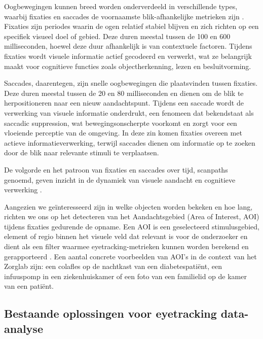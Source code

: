 Oogbewegingen kunnen breed worden onderverdeeld in verschillende types, waarbij fixaties en saccades de voornaamste blik-afhankelijke metrieken zijn \autocite{PAUSZEK2023100031}.
Fixaties zijn periodes waarin de ogen relatief stabiel blijven en zich richten op een specifiek visueel doel of gebied.
Deze duren meestal tussen de 100 en 600 milliseconden, hoewel deze duur afhankelijk is van contextuele factoren.
Tijdens fixaties wordt visuele informatie actief gecodeerd en verwerkt, wat ze belangrijk maakt voor cognitieve functies zoals objectherkenning, lezen en besluitvorming.
\newline \par
Saccades, daarentegen, zijn snelle oogbewegingen die plaatsvinden tussen fixaties.
Deze duren meestal tussen de 20 en 80 milliseconden en dienen om de blik te herpositioneren naar een nieuw aandachtspunt.
Tijdens een saccade wordt de verwerking van visuele informatie onderdrukt, een fenomeen dat bekendstaat als saccadic suppression, wat bewegingsonscherpte voorkomt en zorgt voor een vloeiende perceptie van de omgeving.
In deze zin komen fixaties overeen met actieve informatieverwerking, terwijl saccades dienen om informatie op te zoeken door de blik naar relevante stimuli te verplaatsen.
\newline \par
De volgorde en het patroon van fixaties en saccades over tijd, scanpaths genoemd, geven inzicht in de dynamiek van visuele aandacht en cognitieve verwerking \autocite{PAUSZEK2023100031}.
\newline \par
Aangezien we geïnteresseerd zijn in welke objecten worden bekeken en hoe lang, richten we ons op het detecteren van het Aandachtsgebied (Area of Interest, AOI) tijdens fixaties gedurende de opname.
Een AOI is een geselecteerd stimulusgebied, element of regio binnen het visuele veld dat relevant is voor de onderzoeker en dient als een filter waarmee eyetracking-metrieken kunnen worden berekend en gerapporteerd \autocite{PAUSZEK2023100031}.
Een aantal concrete voorbeelden van AOI's in de context van het Zorglab zijn: een colafles op de nachtkast van een diabetespatiënt, een infuuspomp in een ziekenhuiskamer of een foto van een familielid op de kamer van een patiënt.
\newline \par

\subsection{Bestaande oplossingen voor eyetracking data-analyse}

